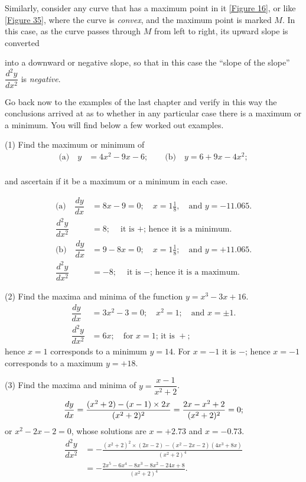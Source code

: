 \documentclass{ximera}
\begin{document}
Similarly, consider any curve that has a maximum
point in it \ref{Figure 16}, or like \ref{Figure 35}, where
the curve is \textit{convex}, and the maximum point is
marked $M$. In this case, as the curve passes through $M$
from left to right, its upward slope is converted

into a downward or negative slope, so that in this
case the ``slope of the slope'' $\dfrac{d^2y}{dx^2}$ is \textit{negative}.

Go back now to the examples of the last chapter
and verify in this way the conclusions arrived at as to
whether in any particular case there is a maximum
or a minimum. You will find below a few worked
out examples.


(1) Find the maximum or minimum of
\begin{align*}
\text{(a)}\quad y &= 4x^2-9x-6; \qquad \text{(b)}\quad y = 6 + 9x-4x^2; \\
\end{align*}

and ascertain if it be a maximum or a minimum in each case.

\begin{align*}
\text{(a)}\quad \dfrac{dy}{dx}
  &= 8x-9=0;\quad x=1\tfrac{1}{8},\quad \text{and } y = -11.065.\\
\dfrac{d^2y}{dx^2}
  &= 8;\quad \text{it is $+$; hence it is a minimum.} \\
\text{(b)}\quad {\dfrac{dy}{dx}}
  &= 9-8x=0;\quad x = 1\tfrac{1}{8};\quad \text{and } y = +11.065.\\
\dfrac{d^2y}{dx^2}
  &= -8;\quad \text{it is $-$; hence it is a maximum.}
\end{align*}

(2) Find the maxima and minima of the function
$y = x^3-3x+16$.
\begin{align*}
\dfrac{dy}{dx}
  &= 3x^2 - 3 = 0;\quad x^2 = 1;\quad \text{and } x = \pm1.\\
\dfrac{d^2y}{dx^2}
  &= 6x;\quad \text{for $x = 1$; it is $+$};
\end{align*}
hence $x=1$ corresponds to a minimum $y=14$. For
$x=-1$ it is $-$; hence $x=-1$ corresponds to a maximum
$y=+18$.


(3) Find the maxima and minima of $y=\dfrac{x-1}{x^2+2}$.
\[
\frac{dy}{dx} = \frac{(x^2+2) \time 1 - (x-1) \times 2x}{(x^2+2)^2}
  = \frac{2x - x^2 + 2}{(x^2 + 2)^2} = 0;
\]
or $x^2 - 2x - 2 = 0$, whose solutions are $x =+2.73$ and
$x=-0.73$.
\begin{align*}
\dfrac{d^2y}{dx^2}
  &= - \frac{(x^2 + 2)^2 \times (2x-2) - (x^2 - 2x - 2)(4x^3 + 8x)}{(x^2 + 2)^4} \\
  &= - \frac{2x^5 - 6x^4 - 8x^3 - 8x^2 - 24x + 8}{(x^2 + 2)^4}.
\end{align*}
\end{document}

